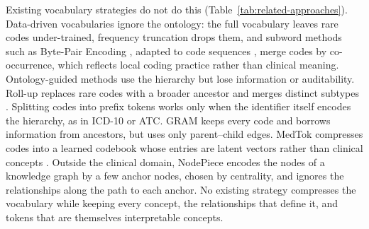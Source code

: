 Existing vocabulary strategies do not do this (Table~\ref{tab:related-approaches}).
Data-driven vocabularies ignore the ontology: the full vocabulary leaves rare codes under-trained, frequency truncation drops them, and subword methods such as Byte-Pair Encoding \cite{sennrich2016bpe, kudo2018sentencepiece}, adapted to code sequences \cite{unistruct}, merge codes by co-occurrence, which reflects local coding practice rather than clinical meaning.
Ontology-guided methods use the hierarchy but lose information or auditability.
Roll-up replaces rare codes with a broader ancestor and merges distinct subtypes \cite{redekop2025zeroshot}.
Splitting codes into prefix tokens \cite{renc2024ethos, waxler2025comet} works only when the identifier itself encodes the hierarchy, as in ICD-10 or ATC.
GRAM \cite{choi2017gram} keeps every code and borrows information from ancestors, but uses only parent--child edges.
MedTok \cite{su2025medtok} compresses codes into a learned codebook whose entries are latent vectors rather than clinical concepts \cite{vandenoord2017vqvae}.
Outside the clinical domain, NodePiece \cite{galkin2022nodepiece} encodes the nodes of a knowledge graph by a few anchor nodes, chosen by centrality, and ignores the relationships along the path to each anchor.
No existing strategy compresses the vocabulary while keeping every concept, the relationships that define it, and tokens that are themselves interpretable concepts.

